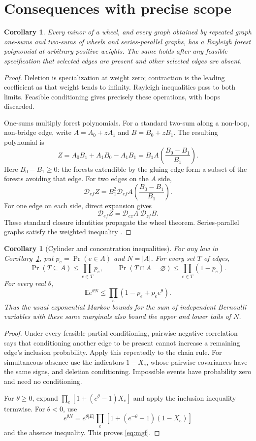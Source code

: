 \documentclass[11pt]{article}
\newtheorem{corollary}[theorem]{Corollary}
\newcommand{\Del}{\mathcal D}
\begin{document}
\section{Consequences with precise scope}
\begin{corollary}\label{cor:closure}
Every minor of a wheel, and every graph obtained by repeated graph one-sums and two-sums of wheels and series-parallel graphs, has a Rayleigh forest polynomial at arbitrary positive weights. The same holds after any feasible specification that selected edges are present and other selected edges are absent.
\end{corollary}
\begin{proof}
Deletion is specialization at weight zero; contraction is the leading coefficient as that weight tends to infinity. Rayleigh inequalities pass to both limits. Feasible conditioning gives precisely these operations, with loops discarded.

One-sums multiply forest polynomials. For a standard two-sum along a non-loop, non-bridge edge, write $A=A_0+zA_1$ and $B=B_0+zB_1$. The resulting polynomial is
\[
 Z=A_0B_1+A_1B_0-A_1B_1
 =B_1A\!\left(\frac{B_0-B_1}{B_1}\right).
\]
Here $B_0-B_1\ge0$: the forests extendible by the gluing edge form a subset of the forests avoiding that edge. For two edges on the $A$ side,
\[
 \Del_{ef}Z=B_1^2\Del_{ef}A\!\left(\frac{B_0-B_1}{B_1}\right).
\]
For one edge on each side, direct expansion gives
\[
 \Del_{ef}Z=\Del_{ez}A\;\Del_{zf}B.
\]
These standard closure identities \cite{Wagner,Erickson} propagate the wheel theorem. Series-parallel graphs satisfy the weighted inequality \cite{Erickson}.
\end{proof}

\begin{corollary}[Cylinder and concentration inequalities]
For any law in Corollary~\ref{cor:closure}, put $p_e=\Pr(e\in A)$ and $N=|A|$. For every set $T$ of edges,
\[
 \Pr(T\subseteq A)\le\prod_{e\in T}p_e,\qquad
 \Pr(T\cap A=\varnothing)\le\prod_{e\in T}(1-p_e).
\]
For every real $\theta$,
\begin{equation}\label{eq:mgf}
 \mathbb E e^{\theta N}\le\prod_e(1-p_e+p_e e^\theta).
\end{equation}
Thus the usual exponential Markov bounds for the sum of independent Bernoulli variables with these same marginals also bound the upper and lower tails of $N$.
\end{corollary}
\begin{proof}
Under every feasible partial conditioning, pairwise negative correlation says that conditioning another edge to be present cannot increase a remaining edge's inclusion probability. Apply this repeatedly to the chain rule. For simultaneous absence use the indicators $1-X_e$, whose pairwise covariances have the same signs, and deletion conditioning. Impossible events have probability zero and need no conditioning.

For $\theta\ge0$, expand $\prod_e[1+(e^\theta-1)X_e]$ and apply the inclusion inequality termwise. For $\theta<0$, use
\[
 e^{\theta N}=e^{\theta |E|}\prod_e[1+(e^{-\theta}-1)(1-X_e)]
\]
and the absence inequality. This proves \eqref{eq:mgf}.
\end{proof}
\end{document}
